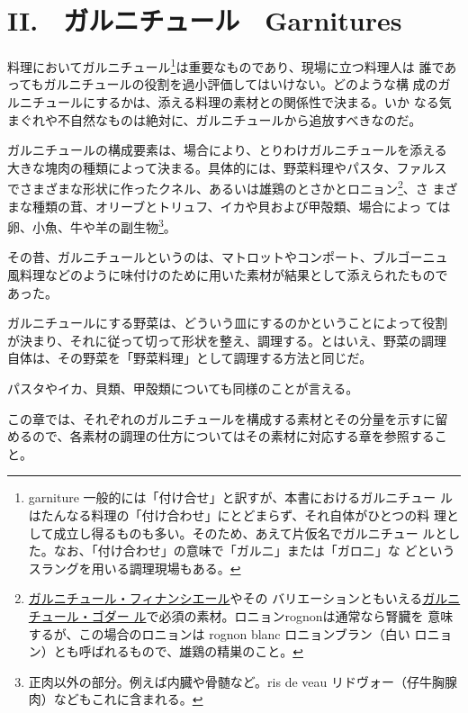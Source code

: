 \hypertarget{ii.ux30acux30ebux30cbux30c1ux30e5ux30fcux30ebgarnitures}{%
\chapter{II.　ガルニチュール　Garnitures}\label{ii.ux30acux30ebux30cbux30c1ux30e5ux30fcux30ebgarnitures}}

\vspace*{1.7\zw}

料理においてガルニチュール\footnote{garniture
  一般的には「付け合せ」と訳すが、本書におけるガルニチュー
  ルはたんなる料理の「付け合わせ」にとどまらず、それ自体がひとつの料
  理として成立し得るものも多い。そのため、あえて片仮名でガルニチュー
  ルとした。なお、「付け合わせ」の意味で「ガルニ」または「ガロニ」な
  どというスラングを用いる調理現場もある。}は重要なものであり、現場に立つ料理人は
誰であってもガルニチュールの役割を過小評価してはいけない。どのような構
成のガルニチュールにするかは、添える料理の素材との関係性で決まる。いか
なる気まぐれや不自然なものは絶対に、ガルニチュールから追放すべきなのだ。

ガルニチュールの構成要素は、場合により、とりわけガルニチュールを添える
大きな塊肉の種類によって決まる。具体的には、野菜料理やパスタ、ファルス
でさまざまな形状に作ったクネル、あるいは雄鶏のとさかとロニョン\footnote{\protect\hyperlink{garniture-financiere}{ガルニチュール・フィナンシエール}やその
  バリエーションともいえる\protect\hyperlink{garniture-godard}{ガルニチュール・ゴダー
  ル}で必須の素材。ロニョンrognonは通常なら腎臓を
  意味するが、この場合のロニョンは rognon blanc ロニョンブラン（白い
  ロニョン）とも呼ばれるもので、雄鶏の精巣のこと。}、さ
まざまな種類の茸、オリーブとトリュフ、イカや貝および甲殻類、場合によっ
ては卵、小魚、牛や羊の副生物\footnote{正肉以外の部分。例えば内臓や骨髄など。ris
  de veau リドヴォー（仔牛胸腺肉）などもこれに含まれる。}。

その昔、ガルニチュールというのは、マトロットやコンポート、ブルゴーニュ
風料理などのように味付けのために用いた素材が結果として添えられたもので
あった。

ガルニチュールにする野菜は、どういう皿にするのかということによって役割
が決まり、それに従って切って形状を整え、調理する。とはいえ、野菜の調理
自体は、その野菜を「野菜料理」として調理する方法と同じだ。

パスタやイカ、貝類、甲殻類についても同様のことが言える。

この章では、それぞれのガルニチュールを構成する素材とその分量を示すに留
めるので、各素材の調理の仕方についてはその素材に対応する章を参照するこ
と。

